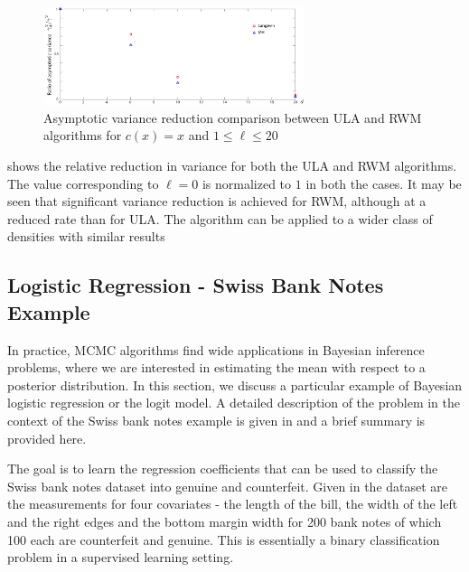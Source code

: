 \begin{figure}[htbp]
	\centering
		\includegraphics[width=3in]{images/Chap5_rel_red_lang_mh_all}
\caption{Asymptotic variance reduction comparison between ULA and RWM algorithms for $c(x) =x$ and $1\leq \ell \leq 20$}
\label{fig:mcmc_ula_rwm_asy_var}
\end{figure}
 shows the relative reduction in variance for both the ULA and RWM algorithms. The value corresponding to $\ell = 0$ is normalized to $1$ in both the cases. It may be seen that significant variance reduction is achieved for RWM, although at a reduced rate than for ULA. The algorithm can be applied to a wider class of densities with similar results %

\subsection{Logistic Regression - Swiss Bank Notes Example}
In practice, MCMC algorithms find wide applications in Bayesian inference problems, where we are interested in estimating the mean with respect to a posterior distribution. In this section, we discuss a particular example of Bayesian logistic regression or the logit model. A detailed description of the problem in the context of the Swiss bank notes example is given in \cite{papmirgir14} and a brief summary is provided here.

The goal is to learn the regression coefficients that can be used to classify the Swiss bank notes dataset into genuine and counterfeit. Given in the dataset are the measurements for four covariates - the length of the bill, the width of the left and the right edges and the bottom margin width for 200 bank notes of which 100 each are counterfeit and genuine. This is essentially a binary classification problem in a supervised learning setting. 

